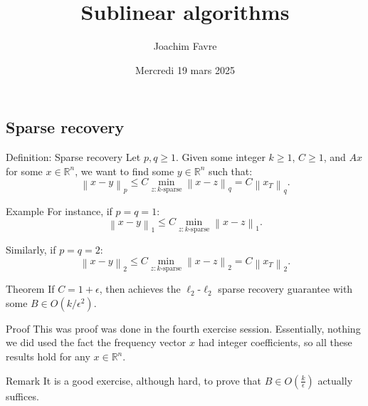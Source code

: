 \documentclass[a4paper]{article}
\title{Sublinear algorithms}
\author{Joachim Favre}
\date{Mercredi 19 mars 2025}
\begin{document}
\maketitle


\subsection{Sparse recovery}

\begin{parag}{Definition: Sparse recovery}
    Let $p, q \geq 1$. Given some integer $k \geq 1$, $C \geq 1$, and $A x$ for some $x \in \mathbb{R}^n$, we want to find some $y \in \mathbb{R}^n$ such that: 
    \[\left\|x -y\right\|_p \leq C \min_{z: \text{$k$-sparse}} \left\|x - z\right\|_q = C \left\|x_T\right\|_q.\]

    \begin{subparag}{Example}
        For instance, if $p = q = 1$: 
        \[\left\|x - y\right\|_1 \leq C\min_{z: \text{$k$-sparse}} \left\|x - z\right\|_1.\]

        Similarly, if $p = q = 2$:
        \[\left\|x - y\right\|_2 \leq C\min_{z: \text{$k$-sparse}} \left\|x - z\right\|_2 = C \left\|x_T\right\|_2.\]
    \end{subparag}
\end{parag}

\begin{parag}{Theorem}
    If $C = 1 + \epsilon$, then  achieves the $\ell_2$-$\ell_2$ sparse recovery guarantee with some $B \in O\left(k/\epsilon^2\right)$.

    \begin{subparag}{Proof}
        This was proof was done in the fourth exercise session. Essentially, nothing we did used the fact the frequency vector $x$ had integer coefficients, so all these results hold for any $x \in \mathbb{R}^n$.
    \end{subparag}

    \begin{subparag}{Remark}
        It is a good exercise, although hard, to prove that $B \in O\left(\frac{k}{\epsilon}\right)$ actually suffices.
    \end{subparag}
\end{parag}
\end{document}
